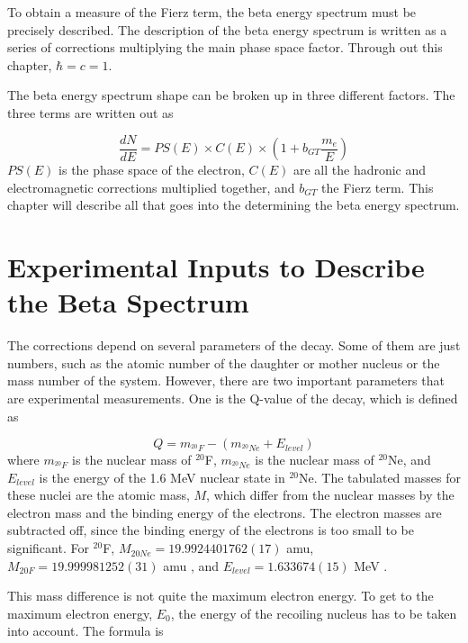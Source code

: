 \documentclass[../MaxHughesThesis.tex]{subfiles}
\begin{document}
To obtain a measure of the Fierz term, the beta energy spectrum must be precisely described.
The description of the beta energy spectrum is written as a series of corrections multiplying the main phase space factor.  
Through out this chapter, $\hbar = c = 1$.

The beta energy spectrum shape can be broken up in three different factors. 
The three terms are written out as  %

\begin{equation}
	\frac{dN}{dE} = PS(E) \times C(E) \times (1 + b_{GT}\frac{m_{e}}{E})
	\label{eq:betaspectrum}
\end{equation}
$PS(E)$ is the phase space of the electron, $C(E)$ are all the hadronic and electromagnetic corrections multiplied together, and $b_{GT}$ the Fierz term.
This chapter will describe all that goes into the determining the beta energy spectrum.

\section{Experimental Inputs to Describe the Beta Spectrum}
The corrections depend on several parameters of the decay. 
Some of them are just numbers, such as the atomic number of the daughter or mother nucleus or the mass number of the system.
However, there are two important parameters that are experimental measurements.
One is the Q-value of the decay, which is defined as %

\begin{equation}
	Q = m_{^{20}F} - (m_{^{20}Ne} + E_{level})
	\label{eq:qval}
\end{equation} 
where $m_{^{20}F}$ is the nuclear mass of $^{20}$F, $m_{^{20}Ne}$ is the nuclear mass of $^{20}$Ne, and $E_{level}$ is the energy of the 1.6 MeV nuclear state in $^{20}$Ne. 
The tabulated masses for these nuclei are the atomic mass, $M$, which differ from the nuclear masses by the electron mass and the binding energy of the electrons.
The electron masses are subtracted off, since the binding energy of the electrons is too small to be significant.
For $^{20}$F, $M_{20Ne} = 19.9924401762 (17)$ amu, $M_{20F} = 19.999981252 (31) $ amu \cite{Wan17} , and $E_{level} = 1.633674 (15)$ MeV  \cite{Til98} .

This mass difference is not quite the maximum electron energy. 
To get to the maximum electron energy, $E_{0}$, the energy of the recoiling nucleus has to be taken into account.
The formula is \cite{Hol74}%
\end{document}
